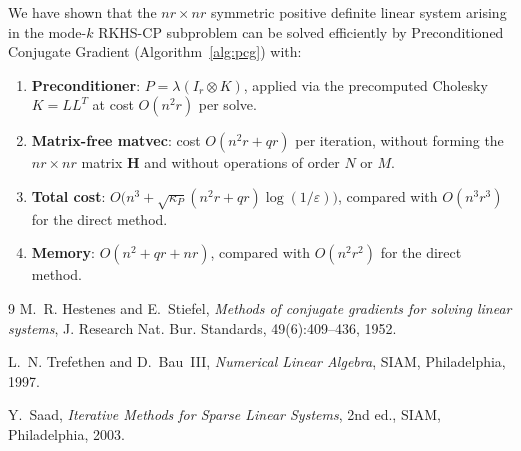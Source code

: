 \documentclass[12pt]{article}
\theoremstyle{definition}
\newcommand{\bH}{\mathbf{H}}
\begin{document}
We have shown that the $nr\times nr$ symmetric positive definite linear system
arising in the mode-$k$ RKHS-CP subproblem can be solved efficiently by
Preconditioned Conjugate Gradient (Algorithm~\ref{alg:pcg}) with:
\begin{enumerate}
  \item \textbf{Preconditioner}: $P=\lambda(I_r\otimes K)$, applied via the
        precomputed Cholesky $K=LL^T$ at cost $O(n^2r)$ per solve.
  \item \textbf{Matrix-free matvec}: cost $O(n^2r+qr)$ per iteration, without
        forming the $nr\times nr$ matrix $\bH$ and without operations of order
        $N$ or $M$.
  \item \textbf{Total cost}: $O\bigl(n^3+\sqrt{\kappa_P}(n^2r+qr)\log(1/\varepsilon)\bigr)$,
        compared with $O(n^3r^3)$ for the direct method.
  \item \textbf{Memory}: $O(n^2+qr+nr)$, compared with $O(n^2r^2)$ for the
        direct method.
\end{enumerate}

\begin{thebibliography}{9}
M.~R. Hestenes and E.~Stiefel,
\textit{Methods of conjugate gradients for solving linear systems},
J. Research Nat. Bur. Standards, 49(6):409--436, 1952.

L.~N. Trefethen and D.~Bau~III,
\textit{Numerical Linear Algebra},
SIAM, Philadelphia, 1997.

Y.~Saad,
\textit{Iterative Methods for Sparse Linear Systems}, 2nd ed.,
SIAM, Philadelphia, 2003.
\end{thebibliography}
\end{document}
